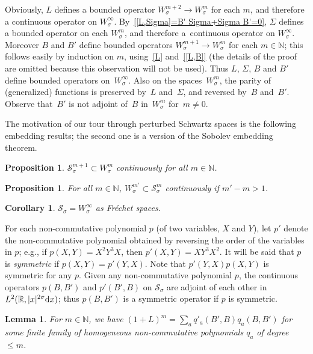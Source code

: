 \documentclass[11pt]{article}
\newtheorem{Corollary}[Theorem]{Corollary}
\newtheorem{Lemma}[Theorem]{Lemma}
\newtheorem{Proposition}[Theorem]{Proposition}
{\theoremstyle{definition}
\newtheorem{Definition}[Theorem]{Definition}
\newtheorem{Note}[Theorem]{Note}
\newtheorem{Example}[Theorem]{Example}
\newtheorem{quest}[Theorem]{Question}
\newtheorem{Remark}[Theorem]{Remark}
\newtheorem{claim}{Claim}
}
\newcommand{\R}{\mathbb{R}}
\newcommand{\N}{\mathbb{N}}
\renewcommand{\SS}{\mathcal{S}}
\begin{document}
Obviously, $L$ def\/ines a bounded operator $W_\sigma^{m+2}\to W_\sigma^m$ for each $m$, and therefore a continuous operator on $W_\sigma^\infty$. By~\eqref{[L,Sigma]=B' Sigma+Sigma B'=0}, $\Sigma$ def\/ines a bounded operator on each $W_\sigma^m$, and therefore a~continuous operator on $W_\sigma^\infty$. Moreover $B$ and $B'$ def\/ine bounded operators $W_\sigma^{m+1}\to W_\sigma^m$ for each $m\in\N$; this follows easily by induction on $m$, using~\eqref{L} and~\eqref{[L,B]} (the details of the proof are omitted because this observation will not be used). Thus $L$, $\Sigma$, $B$ and $B'$ def\/ine bounded operators on~$W_\sigma^\infty$. Also on the spaces~$W_\sigma^m$, the parity of (generalized) functions is preserved by~$L$ and~$\Sigma$, and reversed by~$B$ and~$B'$. Observe that~$B'$ is not adjoint of~$B$ in~$W_\sigma^m$ for~$m\ne0$.


The motivation of our tour through perturbed Schwartz spaces is the following embedding results; the second one is a version of the Sobolev embedding theorem.

\begin{Proposition}\label{p:SS sigma,m' subset W sigma m}
  $\SS_\sigma^{m+1}\subset W_\sigma^m$ continuously for all $m\in\N$.
\end{Proposition}

\begin{Proposition}\label{p:Sobolev}
  For all $m\in\N$, $W_\sigma^{m'}\subset\SS_\sigma^m$ continuously if $m'-m>1$.
\end{Proposition}

\begin{Corollary}\label{c:Sobolev}
  $\SS_\sigma=W_\sigma^\infty$ as Fr\'echet spaces.
\end{Corollary}

For each non-commutative polynomial $p$ (of two variables, $X$ and $Y$), let $p'$ denote the non-commutative polynomial obtained by reversing the order of the variables in $p$; e.g., if $p(X,Y)=X^2Y^3X$, then $p'(X,Y)=XY^3X^2$. It will be said that $p$ is {\em symmetric\/} if $p(X,Y)=p'(Y,X)$. Note that $p'(Y,X)p(X,Y)$ is symmetric for any $p$. Given any non-commutative polynomial $p$, the continuous operators $p(B,B')$ and $p'(B',B)$ on $\SS_\sigma$ are adjoint of each other in $L^2(\R,|x|^{2\sigma}{\rm d}x)$; thus $p(B,B')$ is a symmetric operator if $p$ is symmetric.

\begin{Lemma}\label{l:(1+L) m}
  For $m\in\N$, we have $(1+L)^m=\sum_aq'_a(B',B)q_a(B,B')$ for some finite family of homogeneous non-commutative polynomials $q_a$ of degree $\le m$.
\end{Lemma}
\end{document}
